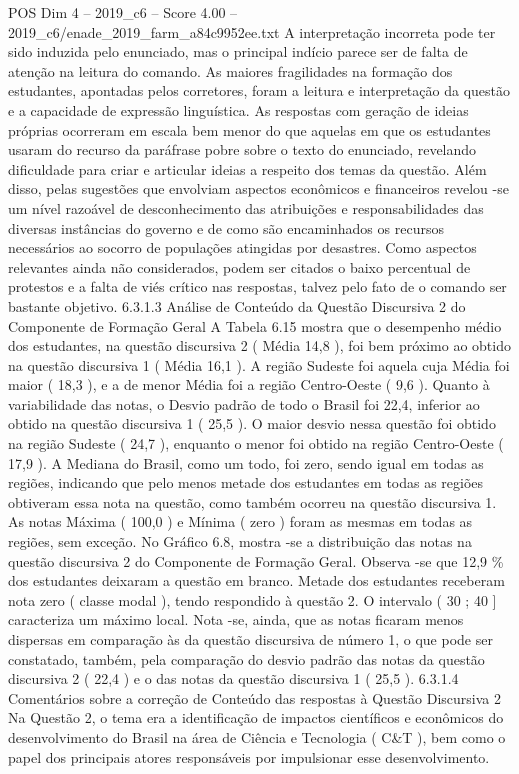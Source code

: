 \begin{textsample}{POS Dim 4 – 2019\_c6 – Score 4.00 – 2019\_c6/enade\_2019\_farm\_a84c9952ee.txt}
A interpretação incorreta pode ter sido induzida pelo enunciado, mas o principal indício parece ser de falta de atenção na leitura do comando.
As maiores fragilidades na formação dos estudantes, apontadas pelos corretores, foram a leitura e interpretação da questão e a capacidade de expressão linguística.
As respostas com geração de ideias próprias ocorreram em escala bem menor do que aquelas em que os estudantes usaram do recurso da paráfrase pobre sobre o texto do enunciado, revelando dificuldade para criar e articular ideias a respeito dos temas da questão.
Além disso, pelas sugestões que envolviam aspectos econômicos e financeiros revelou -se um nível razoável de desconhecimento das atribuições e responsabilidades das diversas instâncias do governo e de como são encaminhados os recursos necessários ao socorro de populações atingidas por desastres.
Como aspectos relevantes ainda não considerados, podem ser citados o baixo percentual de protestos e a falta de viés crítico nas respostas, talvez pelo fato de o comando ser bastante objetivo. 6.3.1.3 Análise de Conteúdo da Questão Discursiva 2 do Componente de Formação Geral A Tabela 6.15 mostra que o desempenho médio dos estudantes, na questão discursiva 2 ( Média 14,8 ), foi bem próximo ao obtido na questão discursiva 1 ( Média 16,1 ).
A região Sudeste foi aquela cuja Média foi maior ( 18,3 ), e a de menor Média foi a região Centro-Oeste ( 9,6 ).
Quanto à variabilidade das notas, o Desvio padrão de todo o Brasil foi 22,4, inferior ao obtido na questão discursiva 1 ( 25,5 ).
O maior desvio nessa questão foi obtido na região Sudeste ( 24,7 ), enquanto o menor foi obtido na região Centro-Oeste ( 17,9 ).
A Mediana do Brasil, como um todo, foi zero, sendo igual em todas as regiões, indicando que pelo menos metade dos estudantes em todas as regiões obtiveram essa nota na questão, como também ocorreu na questão discursiva 1.
As notas Máxima ( 100,0 ) e Mínima ( zero ) foram as mesmas em todas as regiões, sem exceção.
No Gráfico 6.8, mostra -se a distribuição das notas na questão discursiva 2 do Componente de Formação Geral.
Observa -se que 12,9 \% dos estudantes deixaram a questão em branco.
Metade dos estudantes receberam nota zero ( classe modal ), tendo respondido à questão 2.
O intervalo ( 30 ; 40 ] caracteriza um máximo local.
Nota -se, ainda, que as notas ficaram menos dispersas em comparação às da questão discursiva de número 1, o que pode ser constatado, também, pela comparação do desvio padrão das notas da questão discursiva 2 ( 22,4 ) e o das notas da questão discursiva 1 ( 25,5 ). 6.3.1.4 Comentários sobre a correção de Conteúdo das respostas à Questão Discursiva 2 Na Questão 2, o tema era a identificação de impactos científicos e econômicos do desenvolvimento do Brasil na área de Ciência e Tecnologia ( C\&T ), bem como o papel dos principais atores responsáveis por impulsionar esse desenvolvimento.

\end{textsample}
